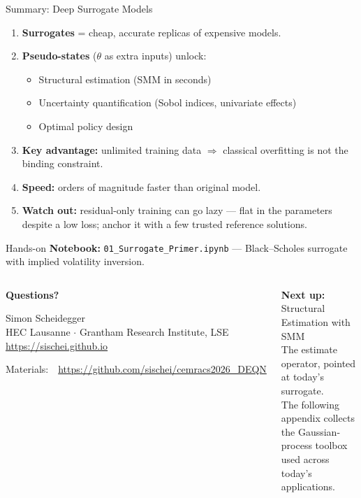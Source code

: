 \documentclass[aspectratio=169,11pt]{beamer}
\newcommand{\emphc}[1]{\textcolor{harvardcrimson}{#1}}
\begin{document}
\begin{frame}{Summary: Deep Surrogate Models}
\begin{enumerate}
  \item \textbf{Surrogates} = cheap, accurate replicas of expensive models.
  \item \textbf{Pseudo-states} ($\theta$ as extra inputs) unlock:
  \begin{itemize}
    \item Structural estimation (SMM in seconds)
    \item Uncertainty quantification (Sobol indices, univariate effects)
    \item Optimal policy design
  \end{itemize}
  \item \textbf{Key advantage:} unlimited training data $\Rightarrow$ classical overfitting is not the binding constraint.
  \item \textbf{Speed:} orders of magnitude faster than original model.
  \item \textbf{Watch out:} residual-only training can go \emphc{lazy} --- flat in the parameters despite a low loss; anchor it with a few trusted reference solutions.
\end{enumerate}

\vspace{0.3cm}
\begin{block}{Hands-on}
\textbf{Notebook:} \texttt{01\_Surrogate\_Primer.ipynb} --- Black--Scholes surrogate with implied volatility inversion.
\end{block}
\end{frame}

\begin{frame}{}
\begin{columns}[c]
\begin{center}
{\Huge \textcolor{uzhblue}{\textbf{Questions?}}}

\vspace{1.0cm}
{\large Simon Scheidegger}\\[4pt]
{\small HEC Lausanne $\cdot$ Grantham Research Institute, LSE}\\[4pt]
\url{https://sischei.github.io}

\vspace{0.6cm}
{\small Materials:~~\url{https://github.com/sischei/cemracs2026_DEQN}}
\end{center}

\begin{center}
\textbf{Next up:}\\[6pt]
{\large Structural Estimation with SMM}\\[10pt]
{\small The \emphc{estimate} operator, pointed at today's surrogate.}\\[12pt]
{\footnotesize The following appendix collects the Gaussian-process toolbox used across today's applications.}
\end{center}
\end{columns}
\end{frame}
\end{document}
